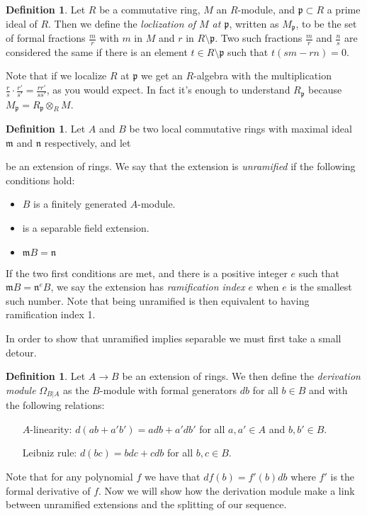 \documentclass[11pt, a4paper, english]{article}
\theoremstyle{definition}
\newtheorem{defin}[theorem]{Definition}
\begin{document}
\begin{defin}
\label{def:localization}
Let $R$ be a commutative ring, $M$ an $R$-module, and $\mathfrak{p} \subset R$ a prime ideal of $R$. Then we define the \textit{loclization of $M$ at $\mathfrak{p}$}, written as $M_\mathfrak{p}$, to be the set of formal fractions $\frac{m}{r}$ with $m$ in $M$ and $r$ in $R \setminus \mathfrak{p}$. Two such fractions $\frac{m}{r}$ and $\frac{n}{s}$ are considered the same if there is an element $t \in R \setminus \mathfrak{p}$ such that $t(sm - rn) = 0$.

Note that if we localize $R$ at $\mathfrak{p}$ we get an $R$-algebra with the multiplication $\frac{r}{s} \cdot \frac{r'}{s'} = \frac{rr'}{ss'}$, as you would expect. In fact it's enough to understand $R_\mathfrak{p}$ because $M_\mathfrak{p} = R_\mathfrak{p} \otimes_R M$.
\end{defin}

\begin{defin}
Let $A$ and $B$ be two local commutative rings with maximal ideal $\mathfrak{m}$ and $\mathfrak{n}$ respectively, and let
be an extension of rings. We say that the extension is \textit{unramified} if the following conditions hold:
\begin{itemize}
\item $B$ is a finitely generated $A$-module.
\item {}
is a separable field extension.
\item $\mathfrak{m}B = \mathfrak{n}$
\end{itemize}
If the two first conditions are met, and there is a positive integer $e$ such that $\mathfrak{m} B = \mathfrak{n}^e B$, we say the extension has \textit{ramification index} $e$ when $e$ is the smallest such number. Note that being unramified is then equivalent to having ramification index 1.
\end{defin}

In order to show that unramified implies separable we must first take a small detour.

\begin{defin}
Let $A \to B$ be an extension of rings. We then define the \textit{derivation module} $\Omega_{B | A}$ as the $B$-module with formal generators $db$ for all $b \in B$ and with the following relations:
\begin{itemize}
\item[$A$-linearity:] $d(ab + a'b') = adb + a'db'$ for all $a, a' \in A$ and $b, b' \in B$.
\item[Leibniz rule:] $d(bc) = bdc + cdb$ for all $b,c \in B$.
\end{itemize}
\end{defin}
Note that for any polynomial $f$ we have that $df(b) = f'(b)db$ where $f'$ is the formal derivative of $f$. Now we will show how the derivation module make a link between unramified extensions and the splitting of our sequence.
\end{document}
